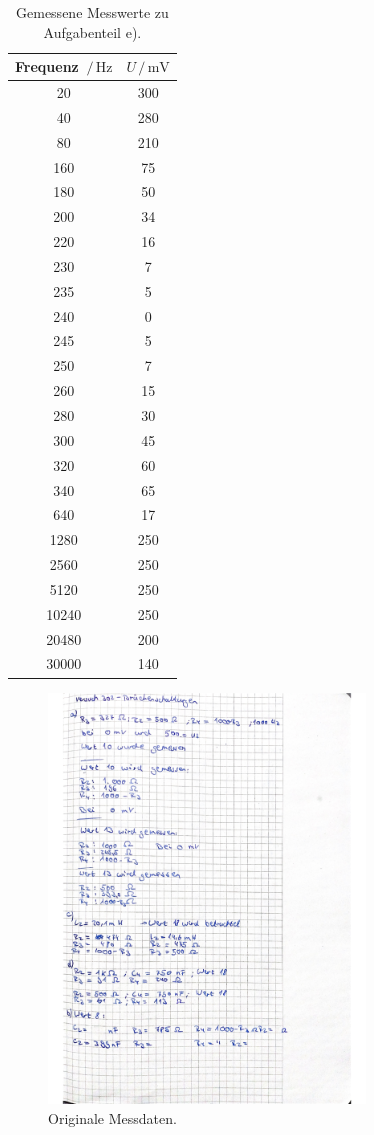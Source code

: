 \begin{table}[H]
  \centering
  \caption{Gemessene Messwerte zu Aufgabenteil e).}
  \label{tab:wertee}
  \begin{tabular}{c c}
    \toprule
    Frequenz $\,/\,\si{\hertz}$ &  $U\,/\, \si{\milli\volt}$ \\
    \midrule
    20 & 300 \\
    40 & 280 \\
    80 & 210 \\
    160 & 75 \\
    180 & 50 \\
    200 & 34 \\
    220 & 16 \\
    230 & 7 \\
    235 & 5 \\
    240 & 0 \\
    245 & 5 \\
    250 & 7 \\
    260 & 15 \\
    280 & 30 \\
    300 & 45 \\
    320 & 60 \\
    340 & 65 \\
    640 & 17 \\
    1280 & 250 \\
    2560 & 250 \\
    5120 &  250 \\
    10240 & 250 \\
    20480 & 200 \\
    30000 & 140 \\
    \bottomrule
  \end{tabular}
\end{table}


\begin{figure}
  \centering
  \includegraphics[width=0.75\textwidth]{dateien/daten1.jpg}
  \caption{Originale Messdaten.}
  \label{fig:daten1}
\end{figure}

